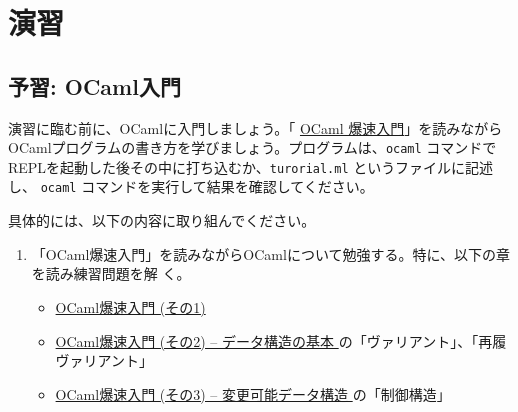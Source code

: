 \documentclass[a4paper,11pt]{jsarticle}
\begin{document}






\newpage
\section{演習}

\subsection{予習: OCaml入門}

演習に臨む前に、OCamlに入門しましょう。「
\href{https://www.fos.kuis.kyoto-u.ac.jp/~igarashi/class/pl/03-ocaml.html#quick-intro-ocaml}{OCaml
  爆速入門}」を読みながらOCamlプログラムの書き方を学びましょう。プログラムは、\verb|ocaml|
コマンドでREPLを起動した後その中に打ち込むか、\verb|turorial.ml| というファイルに記述し、
\verb|ocaml| コマンドを実行して結果を確認してください。

具体的には、以下の内容に取り組んでください。

\begin{enumerate}
\item 「OCaml爆速入門」を読みながらOCamlについて勉強する。特に、以下の章を読み練習問題を解
  く。
  \begin{itemize}
  \item
    \href{https://www.fos.kuis.kyoto-u.ac.jp/~igarashi/class/pl/03-ocaml.html#quick-intro-ocaml}{
      OCaml爆速入門 (その1)}
  \item
    \href{https://www.fos.kuis.kyoto-u.ac.jp/~igarashi/class/pl/03-ocaml.html#quick-intro-ocaml2}{
      OCaml爆速入門 (その2) -- データ構造の基本
    } の「ヴァリアント」、「再履ヴァリアント」
  \item
    \href{https://www.fos.kuis.kyoto-u.ac.jp/~igarashi/class/pl/03-ocaml.html#quick-intro-ocaml2}{
      OCaml爆速入門 (その3) -- 変更可能データ構造
    } の「制御構造」
  \end{itemize}
\end{enumerate}
\end{document}
